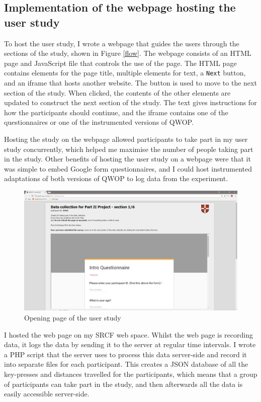 \documentclass[12pt,a4paper,twoside,openright]{report}
\begin{document}
\subsection{Implementation of the webpage hosting the user study}
\label{sec:webpage}

To host the user study, I wrote a webpage that guides the users through the sections of the study, shown in Figure \ref{flow}.
The webpage consists of an HTML page and JavaScript file that controls the use of the page.
The HTML page contains elements for the page title, multiple elements for text, a \texttt{Next} button, and an iframe that hosts another website.
The button is used to move to the next section of the study. When clicked, the contents of the other elements are updated to construct the next section of the study. The text gives instructions for how the participants should continue, and the iframe contains one of the questionnaires or one of the instrumented versions of QWOP.

Hosting the study on the webpage allowed participants to take part in my user study concurrently, which helped me maximise the number of people taking part in the study.
Other benefits of hosting the user study on a webpage were that it was simple to embed Google form questionnaires, and I could host instrumented adaptations of both versions of QWOP to log data from the experiment.

\begin{figure}[tbh]
\centerline{\includegraphics[scale=0.54]{userStudyWebPage.PNG}}
\caption{Opening page of the user study}
\label{study1}
\end{figure}

I hosted the web page on my SRCF web space. Whilst the web page is recording data, it logs the data by sending it to the server at regular time intervals.
I wrote a PHP script that the server uses to process this data server-side and record it into separate files for each participant. This creates a JSON database of all the key-presses and distances travelled for the participants, which means that a group of participants can take part in the study, and then afterwards all the data is easily accessible server-side.
\end{document}

